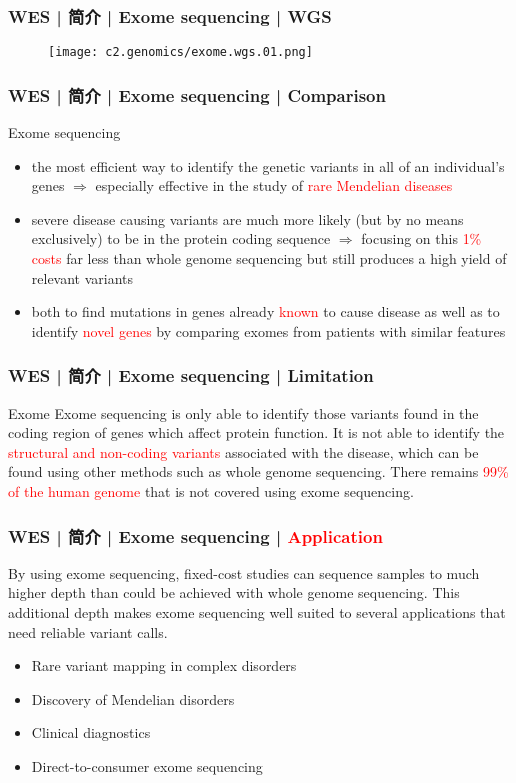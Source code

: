 \begin{frame}
  \frametitle{WES | 简介 | Exome sequencing | WGS}
  \begin{figure}
    \centering
    \texttt{[image: c2.genomics/exome.wgs.01.png]}
  \end{figure}
\end{frame}

\begin{frame}
  \frametitle{WES | 简介 | Exome sequencing | Comparison}
  \begin{block}{Exome sequencing}
    \begin{itemize}
      \item the most efficient way to identify the genetic variants in all of an individual's genes $\Rightarrow$ especially effective in the study of \textcolor{red}{rare Mendelian diseases}
      \item severe disease causing variants are much more likely (but by no means exclusively) to be in the protein coding sequence $\Rightarrow$ focusing on this \textcolor{red}{1\% costs} far less than whole genome sequencing but still produces a high yield of relevant variants
      \item both to find mutations in genes already \textcolor{red}{known} to cause disease as well as to identify \textcolor{red}{novel genes} by comparing exomes from patients with similar features
    \end{itemize}
  \end{block}
\end{frame}

\begin{frame}
  \frametitle{WES | 简介 | Exome sequencing | Limitation}
  \begin{block}{Exome}
    Exome sequencing is only able to identify those variants found in the coding region of genes which affect protein function. It is not able to identify the \textcolor{red}{structural and non-coding variants} associated with the disease, which can be found using other methods such as whole genome sequencing. There remains \textcolor{red}{99\% of the human genome} that is not covered using exome sequencing.
  \end{block}
\end{frame}

\begin{frame}
  \frametitle{WES | 简介 | Exome sequencing | \textcolor{red}{Application}}
  By using exome sequencing, fixed-cost studies can sequence samples to much higher depth than could be achieved with whole genome sequencing. This additional depth makes exome sequencing well suited to several applications that need reliable variant calls.
  \begin{itemize}
    \item Rare variant mapping in complex disorders
    \item Discovery of Mendelian disorders
    \item Clinical diagnostics
    \item Direct-to-consumer exome sequencing
  \end{itemize}
\end{frame}

